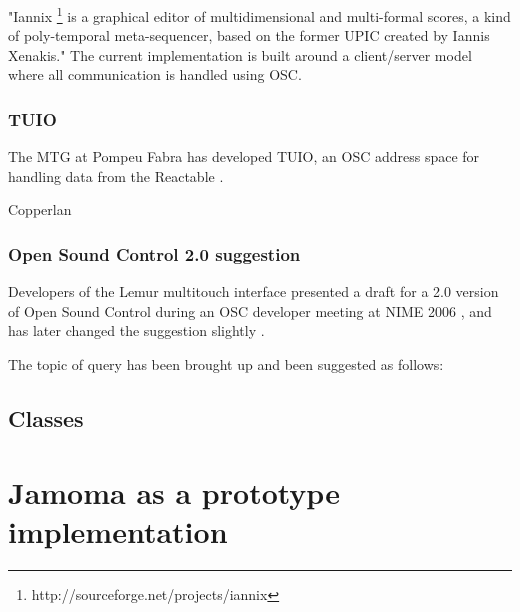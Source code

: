 \documentclass{sig-alternate}
\begin{document}
"Iannix \footnote{http://sourceforge.net/projects/iannix} is a graphical editor of multidimensional and multi-formal scores, a kind of poly-temporal meta-sequencer, based on the former UPIC created by Iannis Xenakis." The current implementation is built around a client/server model where all communication is handled using OSC. 

\cite{Coduys:2004}


\subsubsection{TUIO}

The MTG at Pompeu Fabra has developed TUIO, an OSC address space for handling data from the Reactable \cite{Kaltenbrunner:2005}.

Copperlan

\subsubsection{Open Sound Control 2.0 suggestion}

Developers of the Lemur multitouch interface presented a draft for a 2.0 version of Open Sound Control during an OSC developer meeting at NIME 2006 \cite{Jazzmutant:2006}, and has later changed the suggestion slightly \cite{Jazzmutant:2007}. 

The topic of query has been brought up and been suggested as follows: 






\subsection{Classes} %
\label{sub:classes}








\section{Jamoma as a prototype implementation} %
\label{sec:prototype_implementation}
\end{document}
